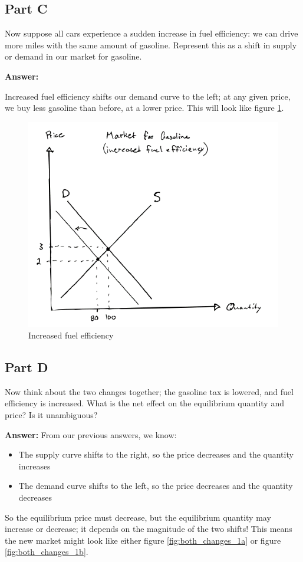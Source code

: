 \documentclass[12pt]{article}
\begin{document}
\subsection*{Part C}
Now suppose all cars experience a sudden increase in fuel efficiency: we can drive more miles with the same amount of gasoline. Represent this as a shift in supply or demand in our market for gasoline.

\textbf{Answer:}

Increased fuel efficiency shifts our demand curve to the left; at any given price, we buy less gasoline than before, at a lower price. This will look like figure \ref{fig:increase_efficiency}.

\begin{figure}
    \centering
    \includegraphics[width=.6\textwidth]{increase_efficiency.png}
    \caption{Increased fuel efficiency}
    \label{fig:increase_efficiency}
\end{figure}

\subsection*{Part D}
Now think about the two changes together; the gasoline tax is lowered, and fuel efficiency is increased. What is the net effect on the equilibrium quantity and price? Is it unambiguous?

\textbf{Answer:}
From our previous answers, we know:
    \begin{itemize}
        \item The supply curve shifts to the right, so the price decreases and the quantity increases
        \item The demand curve shifts to the left, so the price decreases and the quantity decreases
    \end{itemize}

    So the equilibrium price must decrease, but the equilibrium quantity may increase or decrease; it depends on the magnitude of the two shifts! This means the new market might look like either figure \ref{fig:both_changes_1a} or figure \ref{fig:both_changes_1b}.
\end{document}
